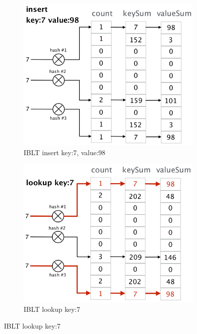 \documentclass[11pt,oneside,a4paper]{article}
\begin{document}
\begin{figure}[hb]
	\centering
	\begin{subfigure}[t]{.33\textwidth}
		\centering
		\includegraphics[width=1\textwidth,scale=1]{figures/iblt_1}
		\caption{IBLT insert key:7, value:98}
		\label{fig:iblt_insert}
	\end{subfigure}%
	\begin{subfigure}[t]{.33\textwidth}
		\centering
		\includegraphics[width=1\textwidth,scale=1]{figures/iblt_2}
		\caption{IBLT lookup key:7}
		\label{fig:iblt_lookup}
	\end{subfigure}

\end{figure}
\end{document}

